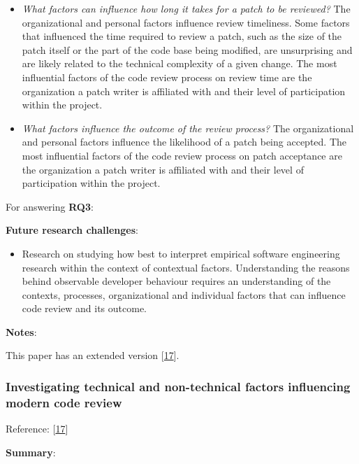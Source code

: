 \documentclass[]{book}
\providecommand{\tightlist}{%
  \setlength{\itemsep}{0pt}\setlength{\parskip}{0pt}}
\begin{document}
\begin{itemize}
\item
  \emph{What factors can influence how long it takes for a patch to be
  reviewed?} The organizational and personal factors influence review
  timeliness. Some factors that influenced the time required to review a
  patch, such as the size of the patch itself or the part of the code
  base being modified, are unsurprising and are likely related to the
  technical complexity of a given change. The most influential factors
  of the code review process on review time are the organization a patch
  writer is affiliated with and their level of participation within the
  project.
\item
  \emph{What factors influence the outcome of the review process?} The
  organizational and personal factors influence the likelihood of a
  patch being accepted. The most influential factors of the code review
  process on patch acceptance are the organization a patch writer is
  affiliated with and their level of participation within the project.
\end{itemize}

For answering \textbf{RQ3}:

\textbf{Future research challenges}:

\begin{itemize}
\tightlist
\item
  Research on studying how best to interpret empirical software
  engineering research within the context of contextual factors.
  Understanding the reasons behind observable developer behaviour
  requires an understanding of the contexts, processes, organizational
  and individual factors that can influence code review and its outcome.
\end{itemize}

\textbf{Notes}:

This paper has an extended version
{[}\protect\hyperlink{ref-baysal2016investigating}{17}{]}.

\subsubsection{Investigating technical and non-technical factors
influencing modern code
review}\label{investigating-technical-and-non-technical-factors-influencing-modern-code-review}

Reference: {[}\protect\hyperlink{ref-baysal2016investigating}{17}{]}

\textbf{Summary}:
\end{document}
